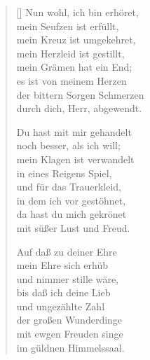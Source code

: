 \begin{multicols}{2}
\begin{verse}[\versewidth]
 Nun wohl, ich bin erhöret,\\
mein Seufzen ist erfüllt,\\
mein Kreuz ist umgekehret,\\
mein Herzleid ist gestillt,\\
mein Grämen hat ein End;\\
es ist von meinem Herzen\\
der bittern Sorgen Schmerzen\\
durch dich, Herr, abgewendt.

 Du hast mit mir gehandelt\\
noch besser, als ich will;\\
mein Klagen ist verwandelt\\
in eines Reigens Spiel,\\
und für das Trauerkleid,\\
in dem ich vor gestöhnet,\\
da hast du mich gekrönet\\
mit süßer Lust und Freud.

 Auf daß zu deiner Ehre\\
mein Ehre sich erhüb\\
und nimmer stille wäre,\\
bis daß ich deine Lieb\\
und ungezählte Zahl\\
der großen Wunderdinge\\
mit ewgen Freuden singe\\
im güldnen Himmelssaal.
   
\end{verse}
\end{multicols}
